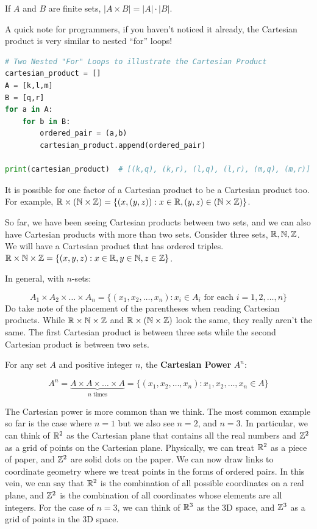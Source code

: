 \documentclass[../Latex-Setup/setup.tex]{subfiles}
\begin{document}
\indent If $A$ and $B$ are finite sets, $|A \times B| = |A| \cdot |B|$.\par

\indent A quick note for programmers, if you haven't noticed it already, the Cartesian product is very similar to nested ``for'' loops!
\begin{lstlisting}[language=Python]
# Two Nested "For" Loops to illustrate the Cartesian Product
cartesian_product = []
A = [k,l,m]
B = [q,r]
for a in A:
    for b in B:
        ordered_pair = (a,b)
        cartesian_product.append(ordered_pair)

print(cartesian_product)  # [(k,q), (k,r), (l,q), (l,r), (m,q), (m,r)]
\end{lstlisting}
\par

\indent It is possible for one factor of a Cartesian product to be a Cartesian product too.
For example, $\mathbb R \times (\mathbb N \times \mathbb Z) = \{(x, (y,z)) : x \in \mathbb R, (y,z) \in (\mathbb N \times \mathbb Z)\}$.\par

\indent So far, we have been seeing Cartesian products between two sets, and we can also have Cartesian products with more than two sets.
Consider three sets, $\mathbb R, \mathbb N, \mathbb Z$. We will have a Cartesian product that has ordered triples.
$\mathbb R \times \mathbb N \times \mathbb Z = \{(x,y,z) : x \in \mathbb R, y \in \mathbb N, z \in \mathbb Z\}$.\par

\indent In general, with $n$-sets:

\[A_1 \times A_2 \times \dots \times A_n = \{(x_1,x_2,\dots,x_n) : x_i \in A_i \text{ for each } i = 1,2,\dots,n\}\]
Do take note of the placement of the parentheses when reading Cartesian products.
While $\mathbb R \times \mathbb N \times \mathbb Z$ and $\mathbb R \times (\mathbb N \times \mathbb Z)$ look the same, they really aren't the same.
The first Cartesian product is between three sets while the second Cartesian product is between two sets.\par

\indent For any set $A$ and positive integer $n$, the \textbf{Cartesian Power} $A^n$:

\[A^n = \underbrace{A \times A \times \dots \times A}_{n \text{ times}} = \{(x_1,x_2,\dots,x_n) : x_1,x_2,\dots,x_n \in A\}\]
\par

\indent The Cartesian power is more common than we think. The most common example so far is the case where $n = 1$ but we also see $n = 2$, and $n = 3$.
In particular, we can think of $\mathbb R^2$ as the Cartesian plane that contains all the real numbers and $\mathbb Z^2$ as a grid of points on the Cartesian plane.
Physically, we can treat $\mathbb R^2$ as a piece of paper, and $\mathbb Z^2$ are solid dots on the paper.
We can now draw links to coordinate geometry where we treat points in the forms of ordered pairs.
In this vein, we can say that $\mathbb R^2$ is the combination of all possible coordinates on a real plane,
and $\mathbb Z^2$ is the combination of all coordinates whose elements are all integers.
For the case of $n = 3$, we can think of $\mathbb R^3$ as the 3D space, and $\mathbb Z^3$ as a grid of points in the 3D space.\par
\end{document}
